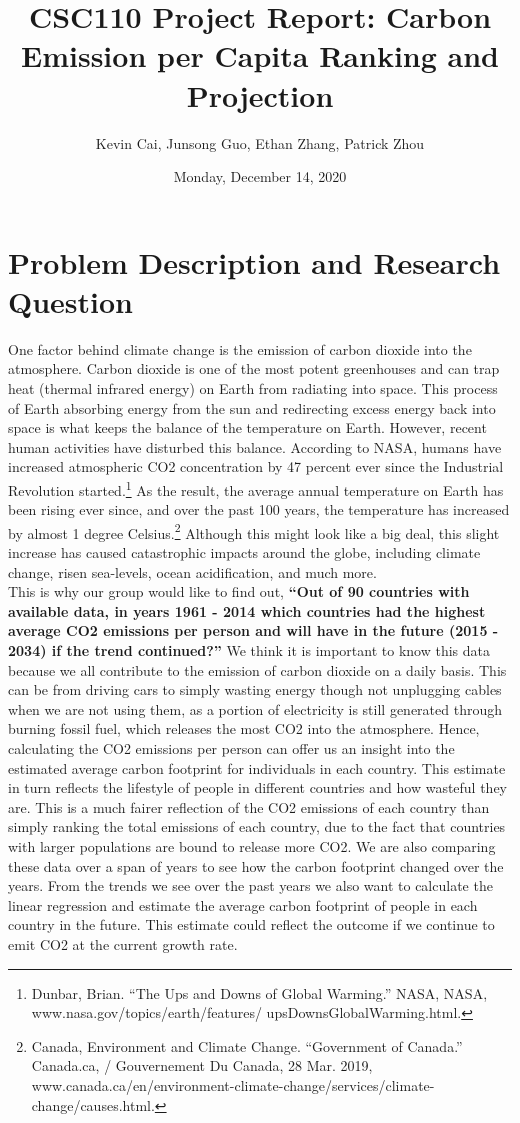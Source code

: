 \documentclass[fontsize=11pt]{article}
\title{CSC110 Project Report: Carbon Emission per Capita Ranking and Projection}
\author{Kevin Cai, Junsong Guo, Ethan Zhang, Patrick Zhou}
\date{Monday, December 14, 2020}
\begin{document}
    \maketitle

    \section*{Problem Description and Research Question} \indent

    One factor behind climate change is the emission of carbon dioxide into the atmosphere. Carbon dioxide is one of the most potent greenhouses and can trap heat (thermal infrared energy) on Earth from radiating into space. This process of Earth absorbing energy from the sun and redirecting excess energy back into space is what keeps the balance of the temperature on Earth. However, recent human activities have disturbed this balance. According to NASA, humans have increased atmospheric CO2 concentration by 47 percent ever since the Industrial Revolution started.\footnote{Dunbar, Brian. “The Ups and Downs of Global Warming.” NASA, NASA, www.nasa.gov/topics/earth/features/
    upsDownsGlobalWarming.html.} As the result, the average annual temperature on Earth has been rising ever since, and over the past 100 years, the temperature has increased by almost 1 degree Celsius.\footnote{Canada, Environment and Climate Change. “Government of Canada.” Canada.ca, / Gouvernement Du Canada, 28 Mar. 2019, www.canada.ca/en/environment-climate-change/services/climate-change/causes.html.} Although this might look like a big deal, this slight increase has caused catastrophic impacts around the globe, including climate change, risen sea-levels, ocean acidification, and much more. \\ \indent This is why our group would like to find out, \textbf{“Out of 90 countries with available data, in years 1961 - 2014 which countries had the highest average CO2 emissions per person and will have in the future (2015 - 2034) if the trend continued?”} We think it is important to know this data because we all contribute to the emission of carbon dioxide on a daily basis. This can be from driving cars to simply wasting energy though not unplugging cables when we are not using them, as a portion of electricity is still generated through burning fossil fuel, which releases the most CO2 into the atmosphere. Hence, calculating the CO2 emissions per person can offer us an insight into the estimated average carbon footprint for individuals in each country. This estimate in turn reflects the lifestyle of people in different countries and how wasteful they are. This is a much fairer reflection of the CO2 emissions of each country than simply ranking the total emissions of each country, due to the fact that countries with larger populations are bound to release more CO2. We are also comparing these data over a span of years to see how the carbon footprint changed over the years. From the trends we see over the past years we also want to calculate the linear regression and estimate the average carbon footprint of people in each country in the future. This estimate could reflect the outcome if we continue to emit CO2 at the current growth rate.
\end{document}
